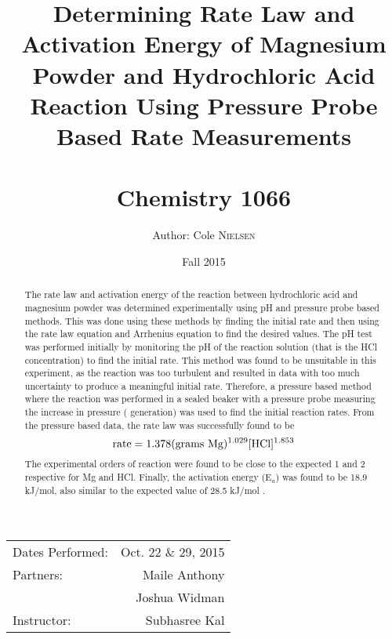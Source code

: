 \documentclass[12pt, letterpaper]{article}
\title{Determining Rate Law and Activation Energy of Magnesium Powder and Hydrochloric Acid Reaction Using Pressure Probe Based Rate Measurements \\ \adforn{21} \\  Chemistry 1066} %
\author{Author: Cole \textsc{Nielsen}} %
\date{Fall 2015} %
\begin{document}
\maketitle %

\begin{center}
 \begin{tabular}{l r}
  Dates Performed: & Oct. 22 \& 29, 2015 \\ %
  Partners: & Maile Anthony \\  
  &Joshua Widman \\ %
  Instructor: & Subhasree Kal %
 \end{tabular}
\end{center}

\pagebreak
\begin{abstract}\doublespacing
\noindent The rate law and activation energy of the reaction between hydrochloric acid and magnesium powder was determined experimentally using pH and pressure probe based methods. This was done using these methods by finding the initial rate and then using the rate law equation and Arrhenius equation to find the desired values. The pH test was performed initially by monitoring the pH of the reaction solution (that is the HCl concentration) to find the initial rate. This method was found to be unsuitable in this experiment, as the reaction was too turbulent and resulted in data with too much uncertainty to produce a meaningful initial rate. Therefore, a pressure based method where the reaction was performed in a sealed beaker with a pressure probe measuring the increase in pressure ( generation) was used to find the initial reaction rates. From the pressure based data, the rate law was successfully found to be 
\begin{equation}
\textnormal{rate}  = 1.378 (\textnormal{grams Mg})^{1.029} [\textnormal{HCl}]^{1.853}
\end{equation}
The experimental orders of reaction were found to be close to the expected 1 and 2 respective for Mg and HCl. Finally, the activation energy (E$_a$) was found to be 18.9 kJ/mol, also similar to the expected value of 28.5 kJ/mol \cite{mg_hcl}. 
\end{abstract}
\hrulefill

\end{document}
